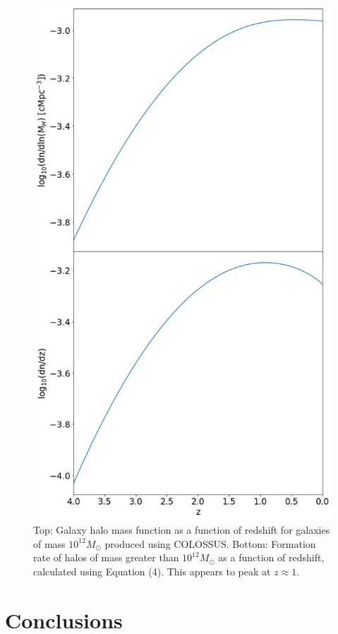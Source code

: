 \documentclass[12pt, twocolumn]{revtex4}    %
\begin{document}
\begin{figure}[H]
\centering
\includegraphics[width=13cm]{Plot_6.jpeg}
\caption{Top: Galaxy halo mass function as a function of redshift for galaxies of mass $10^{12}M_\odot$ produced using COLOSSUS. Bottom: Formation rate of halos of mass greater than $10^{12}M_\odot$ as a function of redshift, calculated using Equation (4). This appears to peak at $z\approx1$.}
\label{fig:6}
\end{figure}
\twocolumngrid
 

\section{Conclusions}
\end{document}
